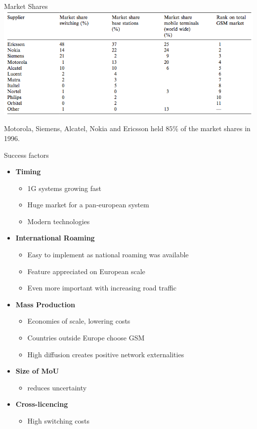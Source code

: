 \begin{frame}{Market Shares}
  \includegraphics[width=\textwidth]{pictures/2gmarketshares}
  
  Motorola, Siemens, Alcatel, Nokia and Ericsson held $85\%$ of the market shares in 1996.
\end{frame}


\begin{frame}{Success factors}
  \begin{itemize}
    \item \textbf{Timing}
    \begin{itemize}
      \item 1G systems growing fast
      \item Huge market for a pan-european system
      \item Modern technologies 
    \end{itemize}
    \item \textbf{International Roaming}
    \begin{itemize}
      \item Easy to implement as national roaming was available
      \item Feature appreciated on European scale
      \item Even more important with increasing road traffic 
    \end{itemize}
    \item \textbf{Mass Production}
    \begin{itemize}
      \item Economies of scale, lowering costs
      \item Countries outside Europe choose GSM
      \item High diffusion creates positive network externalities
    \end{itemize}
    \item \textbf{Size of MoU}
    \begin{itemize}
      \item reduces uncertainty
    \end{itemize}
    \item \textbf{Cross-licencing}
    \begin{itemize}
      \item High switching costs 
    \end{itemize} 
  \end{itemize}
\end{frame}

